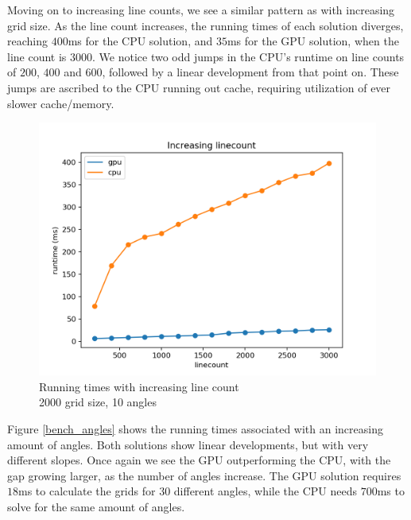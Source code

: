 Moving on to increasing line counts, we see a similar pattern as with increasing grid size. As the line count increases, the running times of each solution diverges, reaching $400$ms for the CPU solution, and $35$ms for the GPU solution, when the line count is $3000$. We notice two odd jumps in the CPU's runtime on line counts of $200$, $400$ and $600$, followed by a linear development from that point on. These jumps are ascribed to the CPU running out cache, requiring utilization of ever slower cache/memory.
\begin{figure}[H]
    \centering
    \captionsetup{justification=centering,margin=2cm}
    \includegraphics[scale=0.6]{figures/linecountGPU_linecountCPU.png}
    \caption{Running times with increasing line count\\\hspace{\textwidth}2000 grid size, 10 angles}
\end{figure}
Figure \ref{bench_angles} shows the running times associated with an increasing amount of angles. Both solutions show linear developments, but with very different slopes. Once again we see the GPU outperforming the CPU, with the gap growing larger, as the number of angles increase. The GPU solution requires $18$ms to calculate the grids for $30$ different angles, while the CPU needs $700$ms to solve for the same amount of angles. 
